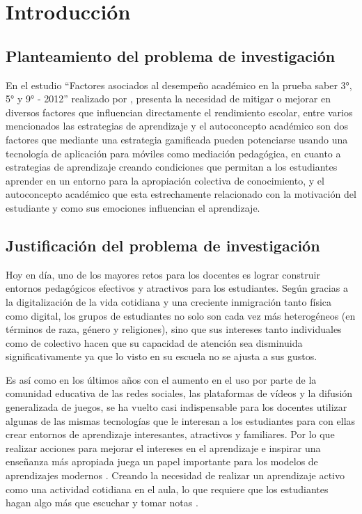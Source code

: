 %
\section{Introducción}

\subsection{Planteamiento del problema de investigación}	

En el estudio ``Factores asociados al desempeño académico en la  prueba saber 3°, 5° y 9° - 2012'' realizado 
por , presenta la necesidad de mitigar o mejorar en diversos factores que influencian 
directamente el rendimiento escolar, entre varios mencionados las estrategias de aprendizaje y el autoconcepto 
académico son dos factores que mediante una estrategia gamificada pueden potenciarse usando una tecnología
de aplicación para móviles como mediación pedagógica, en cuanto a estrategias de aprendizaje creando 
condiciones que permitan a los estudiantes aprender en un entorno para la apropiación colectiva de 
conocimiento, y el autoconcepto académico que esta estrechamente relacionado con la motivación del estudiante 
y como sus emociones influencian el aprendizaje.

\subsection{Justificación del problema de investigación}

Hoy en día, uno de los mayores retos para los docentes es lograr construir entornos pedagógicos efectivos y 
atractivos para los estudiantes. Según  gracias a la digitalización de la vida cotidiana 
y una creciente inmigración tanto física como digital, los grupos de estudiantes no solo son cada vez más 
heterogéneos (en términos de raza, género y religiones), sino que sus intereses tanto individuales como de 
colectivo hacen que su capacidad de atención sea disminuida significativamente ya que lo visto en su escuela 
no se ajusta a sus gustos.

Es así como en los últimos años con el aumento en el uso por parte de la comunidad educativa de las redes 
sociales, las plataformas de vídeos y la difusión generalizada de juegos, se ha vuelto casi indispensable para 
los docentes utilizar algunas de las mismas tecnologías que le interesan a los estudiantes para con ellas 
crear entornos de aprendizaje interesantes, atractivos y familiares. Por lo que realizar acciones para mejorar 
el intereses en el aprendizaje e inspirar una enseñanza más apropiada juega un papel importante para los
modelos de aprendizajes modernos \cite{XU2017}. Creando la necesidad de realizar un aprendizaje activo como 
una actividad cotidiana en el aula, lo que requiere que los estudiantes hagan algo más que escuchar y tomar 
notas \cite{8190501}.

